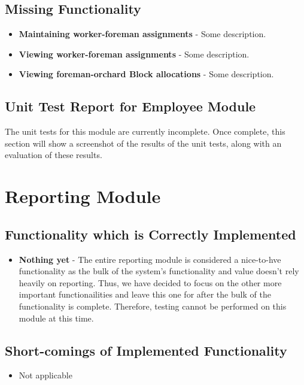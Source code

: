 \documentclass[11pt,fleqn]{book} %
\begin{document}
	\section{Missing Functionality}
		\begin{itemize}
			\item\textbf{Maintaining worker-foreman assignments} -
			Some description.
			
			\item\textbf{Viewing worker-foreman assignments} -
			Some description.
			
			\item\textbf{Viewing foreman-orchard Block allocations} -
			Some description.
		\end{itemize}
	\section{Unit Test Report for Employee Module}
		The unit tests for this module are currently incomplete. Once complete, this section will show a screenshot of the results of the unit tests, along with an evaluation of these results.



\chapter{Reporting Module}
	\section{Functionality which is Correctly Implemented}
		\begin{itemize}
			\item\textbf{Nothing yet} -
			The entire reporting module is considered a nice-to-hve functionality as the bulk of the system's functionality and value doesn't rely heavily on reporting. Thus, we have decided to focus on the other more important functionailities and leave this one for after the bulk of the functionality is complete. Therefore, testing cannot be performed on this module at this time.
		\end{itemize}
	\section{Short-comings of Implemented Functionality}
		\begin{itemize}
			\item{Not applicable}
		\end{itemize}
\end{document}
